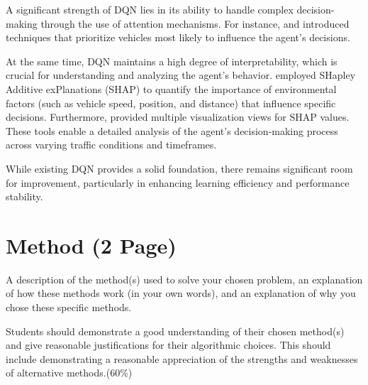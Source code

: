 \documentclass{article}
\begin{document}
A significant strength of DQN lies in its ability to handle complex decision-making through the use of attention mechanisms. For instance, \citep{leurent_social_2019} and \citep{bellotti_designing_2023} introduced techniques that prioritize vehicles most likely to influence the agent’s decisions.  

At the same time, DQN maintains a high degree of interpretability, which is crucial for understanding and analyzing the agent's behavior. \citep{bellotti_explaining_2023} employed SHapley Additive exPlanations (SHAP) to quantify the importance of environmental factors (such as vehicle speed, position, and distance) that influence specific decisions. Furthermore, \citep{bellotti_designing_2023} provided multiple visualization views for SHAP values. These tools enable a detailed analysis of the agent’s decision-making process across varying traffic conditions and timeframes.

While existing DQN provides a solid foundation, there remains significant room for improvement, particularly in enhancing learning efficiency and performance stability. 




\section{Method (2 Page)}
A description of the method(s) used to solve your chosen problem, an explanation of how these methods work (in your own words), and an explanation of why you chose these specific methods.

Students should demonstrate a good understanding of their chosen method(s) and give reasonable justifications for their algorithmic choices. This should include demonstrating a reasonable appreciation of the strengths and weaknesses of alternative methods.(60\%)
\end{document}

